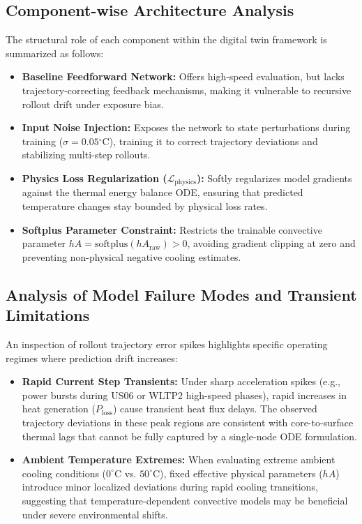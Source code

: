 \subsection{Component-wise Architecture Analysis}
The structural role of each component within the digital twin framework is summarized as follows:
\begin{itemize}
    \item \textbf{Baseline Feedforward Network:} Offers high-speed evaluation, but lacks trajectory-correcting feedback mechanisms, making it vulnerable to recursive rollout drift under exposure bias.
    \item \textbf{Input Noise Injection:} Exposes the network to state perturbations during training ($\sigma = 0.05$$^\circ$C), training it to correct trajectory deviations and stabilizing multi-step rollouts.
    \item \textbf{Physics Loss Regularization ($\mathcal{L}_{\text{physics}}$):} Softly regularizes model gradients against the thermal energy balance ODE, ensuring that predicted temperature changes stay bounded by physical loss rates.
    \item \textbf{Softplus Parameter Constraint:} Restricts the trainable convective parameter $hA = \text{softplus}(hA_{\text{raw}}) > 0$, avoiding gradient clipping at zero and preventing non-physical negative cooling estimates.
\end{itemize}

\subsection{Analysis of Model Failure Modes and Transient Limitations}
An inspection of rollout trajectory error spikes highlights specific operating regimes where prediction drift increases:
\begin{itemize}
    \item \textbf{Rapid Current Step Transients:} Under sharp acceleration spikes (e.g., power bursts during US06 or WLTP2 high-speed phases), rapid increases in heat generation ($P_{\text{loss}}$) cause transient heat flux delays. The observed trajectory deviations in these peak regions are consistent with core-to-surface thermal lags that cannot be fully captured by a single-node ODE formulation.
    \item \textbf{Ambient Temperature Extremes:} When evaluating extreme ambient cooling conditions ($0^\circ$C vs. $50^\circ$C), fixed effective physical parameters ($hA$) introduce minor localized deviations during rapid cooling transitions, suggesting that temperature-dependent convective models may be beneficial under severe environmental shifts.
\end{itemize}

